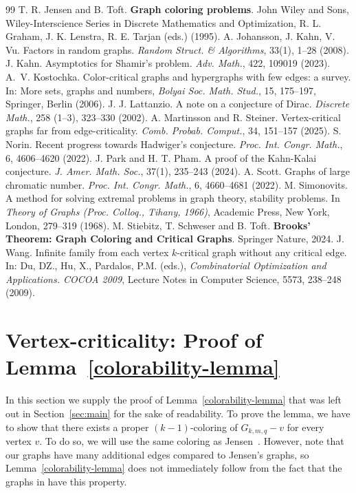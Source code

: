 \documentclass[a4paper,10pt,hidelinks]{amsart}
\theoremstyle{definition}
\begin{document}
\begin{thebibliography}{99}
 T. R. Jensen and B. Toft. \textbf{Graph coloring problems}. John Wiley and Sons, Wiley-Interscience Series in Discrete Mathematics and Optimization, R. L. Graham, J. K. Lenstra, R. E. Tarjan (eds.)  (1995).
 A. Johansson, J. Kahn, V. Vu. Factors in random graphs. \emph{Random Struct. \& Algorithms}, 33(1), 1--28 (2008).
 J. Kahn. Asymptotics for Shamir's problem. \emph{Adv. Math.}, 422, 109019 (2023).
 A.~V. Kostochka. Color-critical graphs and hypergraphs with few edges: a survey. In: More sets, graphs and numbers, \emph{Bolyai Soc. Math. Stud.}, 15, 175--197, Springer, Berlin (2006).
 J. J. Lattanzio. A note on a conjecture of Dirac. \emph{Discrete Math.}, 258 (1--3), 323--330 (2002).
 A. Martinsson and R. Steiner. Vertex-critical graphs far from edge-criticality. \emph{Comb. Probab. Comput.}, 34, 151--157 (2025). 
 S. Norin. Recent progress towards Hadwiger's conjecture. \emph{Proc. Int. Congr. Math.}, 6, 4606--4620 (2022).
 J. Park and H. T. Pham. A proof of the Kahn-Kalai conjecture. \emph{J. Amer. Math. Soc.}, 37(1), 235--243 (2024). 
 A. Scott. Graphs of large chromatic number. \emph{Proc. Int. Congr. Math.}, 6, 4660--4681 (2022).
 M. Simonovits. A method for solving extremal problems in graph theory, stability problems. In \emph{Theory of Graphs (Proc. Colloq., Tihany, 1966)}, Academic Press, New York, London, 279--319 (1968).
 M. Stiebitz, T. Schweser and B. Toft. \textbf{Brooks' Theorem: Graph Coloring and Critical Graphs}. Springer Nature, 2024.
 J. Wang. Infinite family from each vertex $k$-critical graph without any critical edge. In: Du, DZ., Hu, X., Pardalos, P.M. (eds.),  \emph{Combinatorial Optimization and Applications. COCOA 2009}, Lecture Notes in Computer Science, 5573, 238--248 (2009).
\end{thebibliography}

\appendix

\section{Vertex-criticality: Proof of Lemma~\ref{colorability-lemma}}\label{sec:vertcrit}

In this section we supply the proof of Lemma~\ref{colorability-lemma} that was left out in Section~\ref{sec:main} for the sake of readability. To prove the lemma, we have to show that there exists a proper $(k-1)$-coloring of $G_{k,m,q}-v$ for every vertex $v$. To do so, we will use the same coloring as Jensen~\cite{jensen}. However, note that our graphs have many additional edges compared to Jensen's graphs, so Lemma~\ref{colorability-lemma} does not immediately follow from the fact that the graphs in \cite{jensen} have this property.
\end{document}
